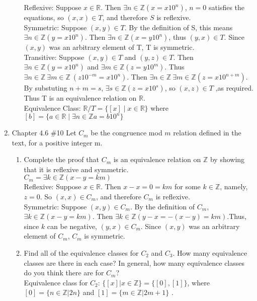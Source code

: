 \documentclass[10pt,a4paper]{article}
\begin{document}
\begin{enumerate}
\begin{enumerate}
Reflexive: Suppose $x \in \mathbb{R}$. Then $\exists n \in \mathbb{Z} (x = x10^n)$, $n=0$ satisfies the equations, so $(x,x)\in T$, and therefore $S$ is reflexive.\\
Symmetric: Suppose $(x,y) \in T$. By the definition of S, this means $\exists n \in \mathbb{Z} (y=x10^n )$. Then $\exists n \in \mathbb{Z} (x=y10^n)$, thus $(y,x) \in T$. Since $(x,y)$ was an arbitrary element of T, T is symmetric.\\
Transitive: Suppose $(x,y) \in T$ and $(y,z) \in T$. Then $\exists n\in \mathbb{Z} (y= x10^n )$ and $ \exists m \in \mathbb{Z} (z= y10^m)$. Thus $\exists n \in \mathbb{Z} \ \exists m \in \mathbb{Z} \ (z10^{-m}=x10^n) $. Then $\exists n \in \mathbb{Z} \ \exists m \in \mathbb{Z} (z= x 10^{n+m})$. By substuting $n+m = s$, $\exists s \in \mathbb{Z} (z=x10^s)$, so $(x,z)\in T$ ,as required.  \\
Thus T is an equivalence relation on $\mathbb{R}$.\\
Equivalence Class:  $ \mathbb{R} / T = \{[x] \mid x \in \mathbb{R}\}$ where $[b] = \{a \in \mathbb{R} \mid \exists n \in \mathbb{Z} a=b10^n\}$\\
\end{enumerate}
\item Chapter 4.6 \#10 Let $C_m$ be the congruence mod $m$ relation defined in the text, for a positive integer m.
\begin{enumerate}
\item Complete the proof that $C_m$ is an equivalence relation on $\mathbb{Z}$ by showing that it is reflexive and symmetric.\\
$C_m = \exists k \in \mathbb{Z} (x-y=km)$\\
Reflexive: Suppose $x \in \mathbb{R}$. Then $x-x=0=km$ for some $k \in \mathbb{Z}$, namely, $z=0$. So $(x,x) \in C_m$, and therefore $C_m$ is reflexive.\\
Symmetric: Suppose $(x,y) \in C_m$. By the definition of $C_m$, $ \exists k \in \mathbb{Z} (x-y=km)$. Then $\exists k \in \mathbb{Z} (y-x=-(x-y)=km)$.Thus, since $k$ can be negative, $(y,x) \in C_m$. Since $(x,y)$ was an arbitrary element of $C_m$, $C_m$ is symmetric. 
\item Find all of the equivalence classes for $C_2$ and $C_3$. How many equivalence classes are there in each case? In general, how many equivalence classes do you think there are for $C_m$?\\
Equivalence class for $C_2$: $\{[x]|x \in \mathbb{Z}\}=\{[0],[1]\}$, where $[0]=\{n \in \mathbb{Z}|2n\}$ and $[1]=\{m \in \mathbb{Z}|2m+1\}$ .\\

\end{enumerate}
\end{enumerate}
\end{document}
